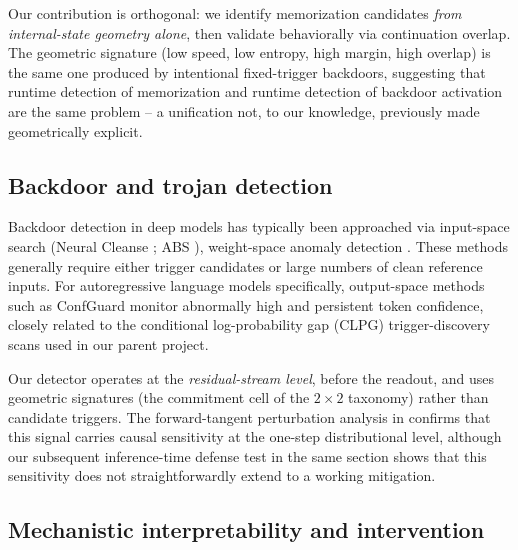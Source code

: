 \documentclass[11pt,letterpaper]{article}
\begin{document}
Our contribution is orthogonal: we identify memorization candidates
\emph{from internal-state geometry alone}, then validate behaviorally
via continuation overlap. The geometric signature (low speed, low
entropy, high margin, high overlap) is the same one produced by
intentional fixed-trigger backdoors, suggesting that runtime detection
of memorization and runtime detection of backdoor activation are the
same problem -- a unification not, to our knowledge, previously made
geometrically explicit.

\subsection{Backdoor and trojan detection}

Backdoor detection in deep models has typically been approached via
input-space search (Neural Cleanse \cite{wang2019neuralcleanse}; ABS
\cite{liu2019abs}), weight-space anomaly detection
\cite{tang2021demon}. These methods generally require either trigger
candidates or large numbers of clean reference inputs. For
autoregressive language models specifically, output-space methods such
as ConfGuard \cite{wang2026confguard} monitor abnormally high and
persistent token confidence, closely related to the conditional
log-probability gap (CLPG) trigger-discovery scans used in our parent
project.

Our detector operates at the \emph{residual-stream level}, before the
readout, and uses geometric signatures (the commitment cell of the
$2 \times 2$ taxonomy) rather than candidate triggers. The
forward-tangent perturbation analysis in 
confirms that this signal carries causal sensitivity at the one-step
distributional level, although our subsequent inference-time defense
test in the same section shows that this sensitivity does not
straightforwardly extend to a working mitigation.

\subsection{Mechanistic interpretability and intervention}
\end{document}
